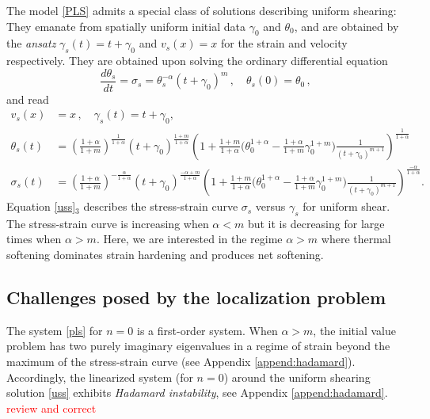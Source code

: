 \documentclass[a4paper,11pt]{article}
\newcommand{\tcr}{\textcolor{red}}
\theoremstyle{remark}
\begin{document}
The model \eqref{PLS} admits  a special class of solutions describing uniform shearing: They emanate
from spatially uniform initial data $\gamma_0$ and $\theta_0$, and are obtained by the {\it ansatz} $\gamma_s (t) = t + \gamma_0 $ and $v_s (x) = x$ 
for the strain and velocity respectively. They are obtained 
upon solving the ordinary differential equation
\begin{equation}
\label{uss2}
\frac{d \theta_s }{dt} = \sigma_s = \theta_s^{-\alpha} (t + \gamma_0)^m \, , \quad \theta_s(0) = \theta_0 \, ,
\end{equation}
and read
\begin{equation} \label{uss}
\begin{aligned}
v_s (x)  &=x \, ,   \quad  \gamma_s(t) = t+\gamma_0,  \quad 
\\
\theta_s(t) &=  \left( \tfrac{1+\alpha}{1+m }\right )^{\frac{1}{1+\alpha}}  (t+\gamma_0)^{\frac{1 + m}{1+\alpha}} 
 \left( 1 +  \tfrac{1+m}{1+\alpha} \big (  \theta_0^{1+\alpha}  - \tfrac{1+\alpha}{1+m} \gamma_0^{1+m} \big ) \tfrac{1}{(t+\gamma_0)^{m+1}}  \right)^{\frac{1}{1+\alpha}}
 \\
  \sigma_s(t)&=
   \left( \tfrac{1+\alpha}{1+m}\right )^{-\frac{\alpha}{1+\alpha}}  (t+\gamma_0)^{\frac{-\alpha + m}{1+\alpha}}  
   \left( 1 +  \tfrac{1+m}{1+\alpha} \big (  \theta_0^{1+\alpha}  - \tfrac{1+\alpha}{1+m} \gamma_0^{1+m} \big ) \tfrac{1}{(t+\gamma_0)^{m+1}}  \right)^{\frac{-\alpha}{1+\alpha}} .
\end{aligned}
\end{equation}
Equation \eqref{uss}$_3$ describes the stress-strain curve $\sigma_s$ versus $\gamma_s$ for uniform shear.
The stress-strain curve is increasing when $\alpha < m$ but it is decreasing for large times when $\alpha > m$.
Here, we are interested in the regime $\alpha > m$ where thermal softening dominates strain hardening and produces net softening.



\subsection{Challenges posed by the localization problem}
\label{sec:challenges}

The system \eqref{pls} for $n=0$ is a first-order system. When $\alpha > m$, the initial value problem  has two purely imaginary eigenvalues in a regime 
of strain beyond the maximum of the stress-strain curve (see Appendix \ref{append:hadamard}). 
Accordingly, the linearized system (for $n=0$) around the uniform shearing solution \eqref{uss} exhibits {\it Hadamard instability}, see Appendix \ref{append:hadamard}.
\tcr{review and correct}
\end{document}
